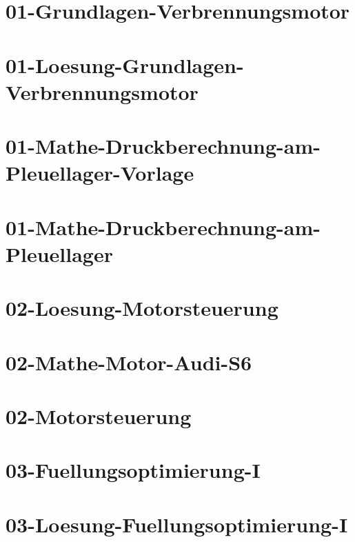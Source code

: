 



\chapter{01-Grundlagen-Verbrennungsmotor}
%
\chapter{01-Loesung-Grundlagen-Verbrennungsmotor}
%
\chapter{01-Mathe-Druckberechnung-am-Pleuellager-Vorlage}
%
\chapter{01-Mathe-Druckberechnung-am-Pleuellager}
%
\chapter{02-Loesung-Motorsteuerung}
%
\chapter{02-Mathe-Motor-Audi-S6}
%
\chapter{02-Motorsteuerung}
%
\chapter{03-Fuellungsoptimierung-I}
%
\chapter{03-Loesung-Fuellungsoptimierung-I}
%
